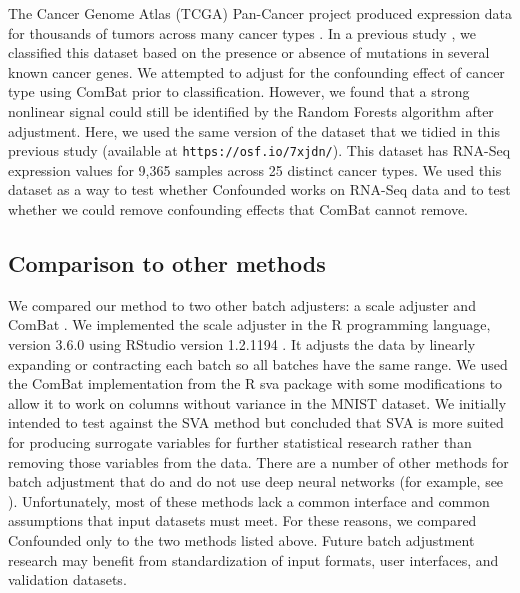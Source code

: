 \documentclass[12pt]{article}
\begin{document}
The Cancer Genome Atlas (TCGA) Pan-Cancer project produced expression data for thousands of tumors across many cancer types \cite{the_cancer_genome_atlas_research_network_cancer_2013}.
In a previous study \cite{dayton_classifying_2017-1}, we classified this dataset based on the presence or absence of mutations in several known cancer genes.
We attempted to adjust for the confounding effect of cancer type using ComBat prior to classification.
However, we found that a strong nonlinear signal could still be identified by the Random Forests algorithm after adjustment.
Here, we used the same version of the dataset that we tidied in this previous study (available at \nolinkurl{https://osf.io/7xjdn/}).
This dataset has RNA-Seq expression values for 9,365 samples across 25 distinct cancer types.
We used this dataset as a way to test whether Confounded works on RNA-Seq data and to test whether we could remove confounding effects that ComBat cannot remove.

\subsection{Comparison to other methods}

We compared our method to two other batch adjusters: a scale adjuster and ComBat \citep{johnson_adjusting_2007}.
We implemented the scale adjuster in the R programming language, version 3.6.0 \citep{r_core_team_r_2014} using RStudio version 1.2.1194 \citep{rstudio_team_rstudio_2018}.
It adjusts the data by linearly expanding or contracting each batch so all batches have the same range.
We used the ComBat implementation from the R sva package \citep{leek_sva_2017} with some modifications to allow it to work on columns without variance in the MNIST dataset.
We initially intended to test against the SVA \citep{leek_capturing_2007} method but concluded that SVA is more suited for producing surrogate variables for further statistical research rather than removing those variables from the data.
There are a number of other methods for batch adjustment that do and do not use deep neural networks (for example, see \citep{leek_capturing_2007,espin-perez_comparison_2018,shaham_removal_2017,shaham_batch_2018}). %
Unfortunately, most of these methods lack a common interface and common assumptions that input datasets must meet.
For these reasons, we compared Confounded only to the two methods listed above.
Future batch adjustment research may benefit from standardization of input formats, user interfaces, and validation datasets.
\end{document}
